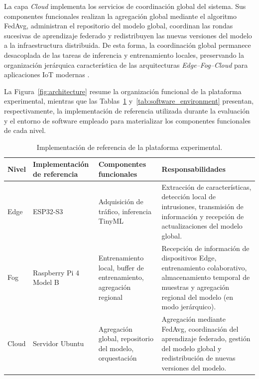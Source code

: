 \documentclass[journal,article,submit,moreauthors]{Definitions/mdpi}
\begin{document}
La capa \textit{Cloud} implementa los servicios de coordinación global del sistema. Sus componentes funcionales realizan la agregación global mediante el algoritmo FedAvg, administran el repositorio del modelo global, coordinan las rondas sucesivas de aprendizaje federado y redistribuyen las nuevas versiones del modelo a la infraestructura distribuida. De esta forma, la coordinación global permanece desacoplada de las tareas de inferencia y entrenamiento locales, preservando la organización jerárquica característica de las arquitecturas \textit{Edge--Fog--Cloud} para aplicaciones IoT modernas \cite{Hajj2023,Ficco2024}.

La Figura~\ref{fig:architecture} resume la organización funcional de la plataforma experimental, mientras que las Tablas~\ref{tab:experimental_platform} y~\ref{tab:software_environment} presentan, respectivamente, la implementación de referencia utilizada durante la evaluación y el entorno de software empleado para materializar los componentes funcionales de cada nivel.

\begin{table}[ht]
\centering
\caption{Implementación de referencia de la plataforma experimental.}
\label{tab:experimental_platform}
\footnotesize
\begin{tabular}{l p{2.5cm}p{4cm}p{5cm}}
\toprule
\textbf{Nivel} &
\textbf{Implementación de referencia} &
\textbf{Componentes funcionales} &
\textbf{Responsabilidades} \\
\midrule

Edge & ESP32-S3 & Adquisición de tráfico, inferencia TinyML & Extracción de características, detección local de intrusiones, transmisión de información y recepción de actualizaciones del modelo global. \\

Fog & Raspberry Pi 4 Model B & Entrenamiento local, buffer de entrenamiento, agregación regional &
Recepción de información de dispositivos Edge, entrenamiento colaborativo, almacenamiento temporal de muestras y agregación regional del modelo (en modo jerárquico). \\

Cloud & Servidor Ubuntu & Agregación global, repositorio del modelo, orquestación &
Agregación mediante FedAvg, coordinación del aprendizaje federado, gestión del modelo global y redistribución de nuevas versiones del modelo. \\
\bottomrule
\end{tabular}
\end{table}
\end{document}
